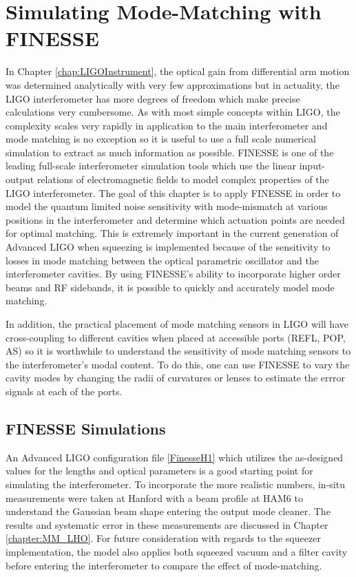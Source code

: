 \chapter{Simulating Mode-Matching with FINESSE}
In Chapter \ref{chap:LIGOInstrument}, the optical gain from differential arm motion was determined analytically with very few approximations but in actuality, the LIGO interferometer has more degrees of freedom which make precise calculations very cumbersome.  As with most simple concepts within LIGO, the complexity scales very rapidly in application to the main interferometer and mode matching is no exception so it is useful to use a full scale numerical simulation to extract as much information as possible.  FINESSE \cite{FinesseManual} \cite{FinesseTechniques} is one of the leading full-scale interferometer simulation tools which use the linear input-output relations of electromagnetic fields to model complex properties of the LIGO interferometer.  The goal of this chapter is to apply FINESSE in order to model the quantum limited noise sensitivity with mode-mismatch at various positions in the interferometer and determine which actuation points are needed for optimal matching.  This is extremely important in the current generation of Advanced LIGO when squeezing is implemented because of the sensitivity to losses in mode matching between the optical parametric oscillator and the interferometer cavities.  By using FINESSE's ability to incorporate higher order beams and RF sidebands, it is possible to quickly and accurately model mode matching.

In addition, the practical placement of mode matching sensors in LIGO will have cross-coupling to different cavities when placed at accessible ports (REFL, POP, AS) so it is worthwhile to understand the sensitivity of mode matching sensors to the interferometer's modal content.  To do this, one can use FINESSE to vary the cavity modes by changing the radii of curvatures or lenses to estimate the errror signals at each of the ports.

	\section{FINESSE Simulations}
		An Advanced LIGO configuration file \ref{FinesseH1} which utilizes the as-designed values for the lengths and optical parameters is a good starting point for simulating the interferometer.  To incorporate the more realistic numbers, in-situ measurements were taken at Hanford with a beam profile at HAM6 to understand the Gaussian beam shape entering the output mode cleaner. The results and systematic error in these measurements are discussed in Chapter \ref{chapter:MM_LHO}.  For future consideration with regards to the squeezer implementation, the model also applies both squeezed vacuum and a filter cavity before entering the interferometer to compare the effect of mode-matching.
		
